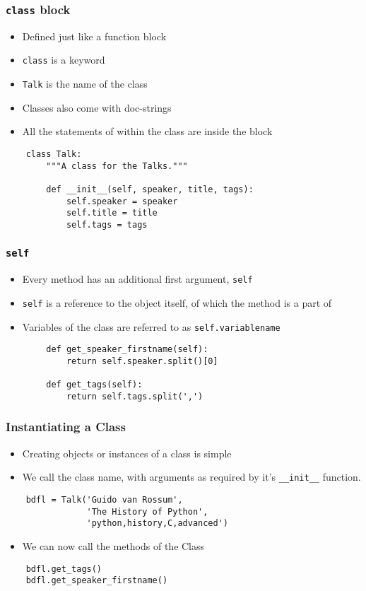 \begin{frame}[fragile]
  \frametitle{\texttt{class} block}
  \begin{itemize}
  \item Defined just like a function block
  \item \texttt{class} is a keyword
  \item \texttt{Talk} is the name of the class
  \item Classes also come with doc-strings
  \item All the statements of within the class are inside the block
  \end{itemize}
  \begin{lstlisting}
    class Talk:
        """A class for the Talks."""

        def __init__(self, speaker, title, tags):
            self.speaker = speaker
            self.title = title
            self.tags = tags
  \end{lstlisting}
\end{frame}

\begin{frame}[fragile]
  \frametitle{\texttt{self}}
  \begin{itemize}
  \item Every method has an additional first argument, \texttt{self}
  \item \texttt{self} is a reference to the object itself, of which
    the method is a part of
  \item Variables of the class are referred to as \texttt{self.variablename}
  \end{itemize}
  \begin{lstlisting}
        def get_speaker_firstname(self):
            return self.speaker.split()[0]

        def get_tags(self):
            return self.tags.split(',')
  \end{lstlisting}
\end{frame}

\begin{frame}[fragile]
  \frametitle{Instantiating a Class}
  \begin{itemize}
  \item Creating objects or instances of a class is simple
  \item We call the class name, with arguments as required by it's
    \texttt{\_\_init\_\_} function. 
  \end{itemize}
  \begin{lstlisting}
    bdfl = Talk('Guido van Rossum', 
                'The History of Python', 
                'python,history,C,advanced')
  \end{lstlisting}
  \begin{itemize}
  \item We can now call the methods of the Class
  \end{itemize}
  \begin{lstlisting}
    bdfl.get_tags()
    bdfl.get_speaker_firstname()
  \end{lstlisting}
\end{frame}

